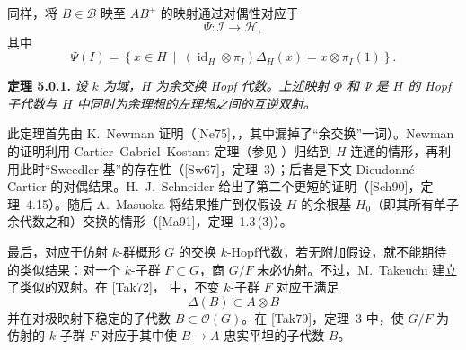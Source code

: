 同样，将 \(B\in\mathcal B\) 映至 \(AB^+\) 的映射通过对偶性对应于
\[
  \Psi:\mathcal I\longrightarrow\mathcal H,
\]
其中
\[
  \Psi(I)
  =
  \left\{
    x\in H\ \middle|\
    (\operatorname{id}_H\otimes\pi_I)\Delta_H(x)
    =
    x\otimes\pi_I(1)
  \right\}.
\]

\medskip
\noindent\textbf{定理 5.0.1.}
\label{sga3:VIIB:5.0.1}
{\itshape 设 \(k\) 为域，\(H\) 为余交换 Hopf 代数。上述映射 \(\Phi\) 和 \(\Psi\) 是 \(H\) 的 Hopf 子代数与 \(H\) 中同时为余理想的左理想之间的互逆双射。}

此定理首先由 K.~Newman 证明\textup{（[Ne75]，，其中漏掉了“余交换”一词）}。Newman 的证明利用 Cartier--Gabriel--Kostant 定理\textup{（参见 ）}归结到 \(H\) 连通的情形，再利用此时“Sweedler 基”的存在性\textup{（[Sw67]，定理~3）}；后者是下文 Dieudonn\'e--Cartier  的对偶结果。H.~J.~Schneider 给出了第二个更短的证明\textup{（[Sch90]，定理~4.15）}。随后 A.~Masuoka 将结果推广到仅假设 \(H\) 的余根基 \(H_0\)（即其所有单子余代数之和）交换的情形\textup{（[Ma91]，定理~1.3\,(3)）}。

最后，对应于仿射 \(k\)-群概形 \(G\) 的交换 \(k\)-Hopf代数，若无附加假设，就不能期待  的类似结果：对一个 \(k\)-子群 \(F\subset G\)，商 \(G/F\) 未必仿射。不过，M.~Takeuchi 建立了类似的双射。在 \textup{[Tak72]，} 中，不变 \(k\)-子群 \(F\) 对应于满足
\[
  \Delta(B)\subset A\otimes B
\]
并在对极映射下稳定的子代数 \(B\subset\mathcal O(G)\)。在 \textup{[Tak79]，定理~3} 中，使 \(G/F\) 为仿射的 \(k\)-子群 \(F\) 对应于其中使 \(B\to A\) 忠实平坦的子代数 \(B\)。
